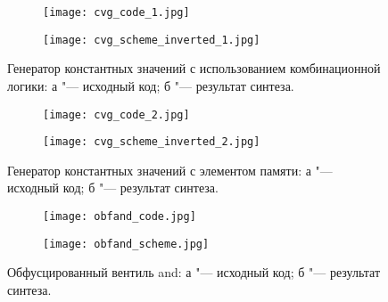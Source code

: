 \begin{figure}[ht]
\centering
  \begin{subfigure}[b]{1\textwidth}
    \centering
    \texttt{[image: cvg\_code\_1.jpg]}
    \caption{}
  \end{subfigure}
  \begin{subfigure}[b]{1\textwidth}
    \centering
    \texttt{[image: cvg\_scheme\_inverted\_1.jpg]}
    \caption{}
  \end{subfigure}
  \caption{ Генератор константных значений с использованием комбинационной логики: а "--- исходный код;
            б "--- результат синтеза.}
  \label{fig:fire_alarms}
\end{figure}



\begin{figure}[ht]
\centering
  \begin{subfigure}[b]{1\textwidth}
    \centering
    \texttt{[image: cvg\_code\_2.jpg]}
    \caption{}
  \end{subfigure}
  \begin{subfigure}[b]{1\textwidth}
    \centering
    \texttt{[image: cvg\_scheme\_inverted\_2.jpg]}
    \caption{}
  \end{subfigure}
  \caption{ Генератор константных значений с элементом памяти: а "--- исходный код;
            б "--- результат синтеза.}
  \label{fig:fire_alarms}
\end{figure}





\begin{figure}[ht]
\centering
  \begin{subfigure}[p]{1\textwidth}
    \centering
    \texttt{[image: obfand\_code.jpg]}
    \caption{}
  \end{subfigure}
  \begin{subfigure}[b]{1\textwidth}
    \centering
    \texttt{[image: obfand\_scheme.jpg]}
    \caption{}
  \end{subfigure}
  \caption{ Обфусцированный вентиль and: а "--- исходный код;
            б "--- результат синтеза.}
  \label{fig:fire_alarms}
\end{figure}

\FloatBarrier


